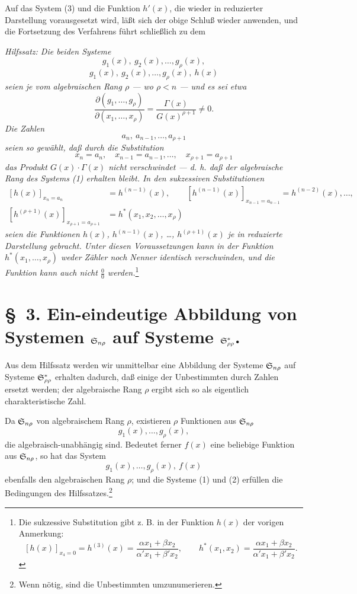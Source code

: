 Auf das System (3) und die Funktion $h'(x)$, die wieder in reduzierter Darstellung vorausgesetzt wird, läßt sich der obige Schluß wieder anwenden, und die Fortsetzung des Verfahrens führt schließlich zu dem

\emph{Hilfssatz: Die beiden Systeme}
\[
  g_1(x),\ g_2(x),\ldots,g_\rho(x),
\]
\[
  g_1(x),\ g_2(x),\ldots,g_\rho(x),\ h(x)
\]
\emph{seien je vom algebraischen Rang $\rho$ --- wo $\rho<n$ --- und es sei etwa}
\[
 \frac{\partial(g_1,\ldots,g_\rho)}{\partial(x_1,
\ldots,x_\rho)}
 =\frac{\Gamma(x)}{G(x)^{\rho+1}}\ne0.
\]
\emph{Die Zahlen}
\[
  a_n,
\ a_{n-1},\ldots,a_{\rho+1}
\]
\emph{seien so gewählt, daß durch die Substitution}
\[
  x_n=a_n,\quad x_{n-1}=a_{n-1},\ldots,\quad x_{\rho+1}=a_{\rho+1}
\]
\emph{das Produkt $G(x)\cdot\Gamma(x)$ nicht verschwindet --- d. h. daß der algebraische Rang des Systems (1) erhalten bleibt. In den sukzessiven Substitutionen}
\[
\begin{aligned}
 [h(x)]_{x_n=a_n}&=h^{(n-1)}(x),\qquad
 [h^{(n-1)}(x)]_{x_{n-1}=a_{n-1}}=h^{(n-2)}(x),\ldots,\\
 [h^{(\rho+1)}(x)]_{x_{\rho+1}=a_{\rho+1}}&=h^*(x_1,x_2,\ldots,x_\rho)
\end{aligned}
\]
\emph{seien die Funktionen $h(x)$, $h^{(n-1)}(x)$, \ldots, $h^{(\rho+1)}(x)$ je in reduzierte Darstellung gebracht. Unter diesen Voraussetzungen kann in der Funktion $h^*(x_1,\ldots,x_\rho)$ weder Zähler noch Nenner identisch verschwinden, und die Funktion kann auch nicht $\frac{0}{0}$ werden.}\footnote{Die sukzessive Substitution gibt z. B. in der Funktion $h(x)$ der vorigen Anmerkung:
\[
 [h(x)]_{x_4=0}=h^{(3)}(x)=\frac{\alpha x_1+\beta x_2}{\alpha' x_1+\beta' x_2},\qquad
 h^*(x_1,x_2)=\frac{\alpha x_1+\beta x_2}{\alpha' x_1+\beta' x_2}.
\]}

\section*{\S\ 3. Ein-eindeutige Abbildung von Systemen $\mathfrak{S}_{n\rho}$ auf Systeme $\mathfrak{S}^*_{\rho\rho}$.}

Aus dem Hilfssatz werden wir unmittelbar eine Abbildung der Systeme $\mathfrak{S}_{n\rho}$ auf Systeme $\mathfrak{S}^*_{\rho\rho}$ erhalten dadurch, daß einige der Unbestimmten durch Zahlen ersetzt werden; der algebraische Rang $\rho$ ergibt sich so als eigentlich charakteristische Zahl.

Da $\mathfrak{S}_{n\rho}$ von algebraischem Rang $\rho$, existieren $\rho$ Funktionen aus $\mathfrak{S}_{n\rho}$
\begin{equation}
  g_1(x),\ldots,g_\rho(x),
\tag{1}
\end{equation}
die algebraisch-unabhängig sind. Bedeutet ferner $f(x)$ eine beliebige Funktion aus $\mathfrak{S}_{n\rho}$, so hat das System
\begin{equation}
  g_1(x),\ldots,g_\rho(x),\ f(x)
\tag{2}
\end{equation}
ebenfalls den algebraischen Rang $\rho$; und die Systeme (1) und (2) erfüllen die Bedingungen des Hilfssatzes.\footnote{Wenn nötig, sind die Unbestimmten umzunumerieren.}

